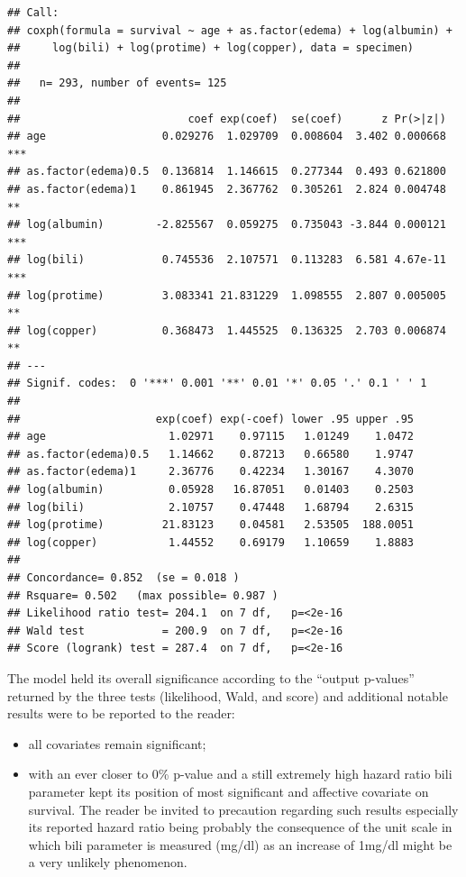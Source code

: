 \documentclass[]{article}
\providecommand{\tightlist}{%
  \setlength{\itemsep}{0pt}\setlength{\parskip}{0pt}}
\begin{document}
\begin{verbatim}
## Call:
## coxph(formula = survival ~ age + as.factor(edema) + log(albumin) + 
##     log(bili) + log(protime) + log(copper), data = specimen)
## 
##   n= 293, number of events= 125 
## 
##                          coef exp(coef)  se(coef)      z Pr(>|z|)    
## age                  0.029276  1.029709  0.008604  3.402 0.000668 ***
## as.factor(edema)0.5  0.136814  1.146615  0.277344  0.493 0.621800    
## as.factor(edema)1    0.861945  2.367762  0.305261  2.824 0.004748 ** 
## log(albumin)        -2.825567  0.059275  0.735043 -3.844 0.000121 ***
## log(bili)            0.745536  2.107571  0.113283  6.581 4.67e-11 ***
## log(protime)         3.083341 21.831229  1.098555  2.807 0.005005 ** 
## log(copper)          0.368473  1.445525  0.136325  2.703 0.006874 ** 
## ---
## Signif. codes:  0 '***' 0.001 '**' 0.01 '*' 0.05 '.' 0.1 ' ' 1
## 
##                     exp(coef) exp(-coef) lower .95 upper .95
## age                   1.02971    0.97115   1.01249    1.0472
## as.factor(edema)0.5   1.14662    0.87213   0.66580    1.9747
## as.factor(edema)1     2.36776    0.42234   1.30167    4.3070
## log(albumin)          0.05928   16.87051   0.01403    0.2503
## log(bili)             2.10757    0.47448   1.68794    2.6315
## log(protime)         21.83123    0.04581   2.53505  188.0051
## log(copper)           1.44552    0.69179   1.10659    1.8883
## 
## Concordance= 0.852  (se = 0.018 )
## Rsquare= 0.502   (max possible= 0.987 )
## Likelihood ratio test= 204.1  on 7 df,   p=<2e-16
## Wald test            = 200.9  on 7 df,   p=<2e-16
## Score (logrank) test = 287.4  on 7 df,   p=<2e-16
\end{verbatim}

The model held its overall significance according to the ``output
p-values'' returned by the three tests (likelihood, Wald, and score) and
additional notable results were to be reported to the reader:

\begin{itemize}
\tightlist
\item
  all covariates remain significant;
\item
  with an ever closer to 0\% p-value and a still extremely high hazard
  ratio bili parameter kept its position of most significant and
  affective covariate on survival. The reader be invited to precaution
  regarding such results especially its reported hazard ratio being
  probably the consequence of the unit scale in which bili parameter is
  measured (mg/dl) as an increase of 1mg/dl might be a very unlikely
  phenomenon.
\end{itemize}
\end{document}
